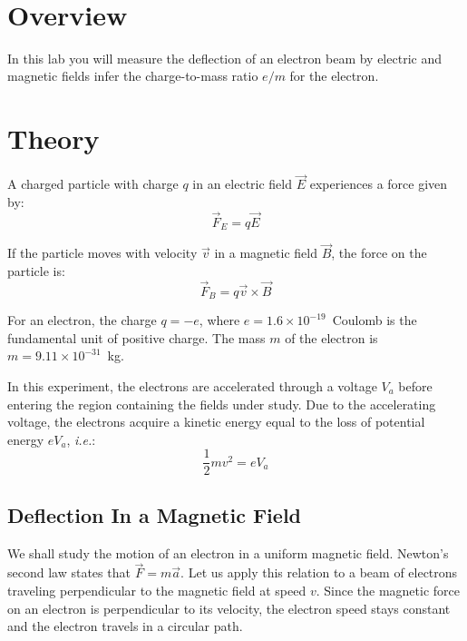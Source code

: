 \documentclass{tufte-handout}
\begin{document}



\vspace{0.5cm}
\\
\vspace{0.5cm}

\section{Overview}

In this lab you will measure the deflection of an electron beam by electric and
magnetic fields infer the charge-to-mass ratio $e/m$ for the electron.

\section{Theory}

A charged particle with charge $q$ in an electric field $\vec{E}$
experiences a force given by:
\begin{equation}
\vec{F}_E = q \vec{E}
\end{equation}

\noindent If the particle moves with velocity $\vec{v}$ in a magnetic field
$\vec{B}$, the force on the particle is:
\begin{equation}
\label{lorentz}
\vec{F}_B = q \vec{v} \times \vec{B}
\end{equation}

For an electron, the charge $q = -e$, where $e = 1.6 \times 10^{-19}$~Coulomb is
the fundamental unit of positive charge. The mass $m$ of the electron is $m =
9.11 \times 10^{-31}$~kg.

In this experiment, the electrons are accelerated through a voltage
$V_a$ before entering the region containing the fields
under study. Due to the accelerating voltage, the electrons acquire a
kinetic energy equal to the loss of potential energy $eV_a$, {\em i.e.}:
\begin{equation}
\label{energy}
\frac{1}{2} mv^{2} = eV_a
\end{equation}

\subsection{Deflection In a Magnetic Field}

We shall study the motion of an electron in a uniform magnetic field.  Newton's
second law states that $\vec{F} = m\vec{a}$. Let us apply this relation to a
beam of electrons traveling perpendicular to the magnetic field at speed
$v$. Since the magnetic force on an electron is perpendicular to its velocity,
the electron speed stays constant and the electron travels in a circular path.
\end{document}
